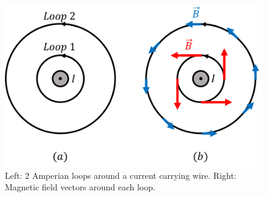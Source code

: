 \begin{framed}
\begin{figure}[!htbp]
\centering
\includegraphics[width=0.6\linewidth]{files/Ampere_circulation-e38a2746744c28a733119cb646d86f03.png}
\caption[]{Left: 2 Amperian loops around a current carrying wire. Right: Magnetic field vectors around each loop.}
\label{fig:magneticsource:amperecirculation}
\end{figure}
\end{framed}

